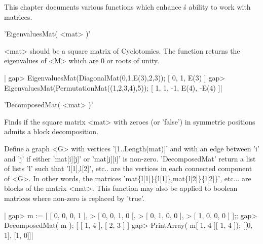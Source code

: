 

This  chapter documents various functions  which enhance \GAP\'s ability
to work with matrices.

%
%

'EigenvaluesMat( <mat> )'

<mat>  should be a  square matrix of  Cyclotomics. The function returns the
eigenvalues of <M> which are 0 or roots of unity.

|    gap> EigenvaluesMat(DiagonalMat(0,1,E(3),2,3));
    [ 0, 1, E(3) ]
    gap> EigenvaluesMat(PermutationMat((1,2,3,4),5));
    [ 1, 1, -1, E(4), -E(4) ]|

%
%

'DecomposedMat( <mat> )'

Finds  if the  square matrix  <mat> with  zeroes (or  'false') in symmetric
positions admits a block decomposition.

Define  a  graph  <G>  with  vertices  '[1..Length(mat)]'  and with an edge
between  'i'  and  'j'  if  either  'mat[i][j]' or 'mat[j][i]' is non-zero.
'DecomposedMat' return a list of lists 'l' such that 'l[1],l[2]', etc.. are
the  vertices  in  each  connected  component  of  <G>. In other words, the
matrices  'mat\{l[1]\}\{l[1]\},mat\{l[2]\}\{l[2]\}',  etc...  are blocks of
the  matrix <mat>.  This function  may also  be applied to boolean matrices
where non-zero is replaced by 'true'.

|    gap> m := [ [  0,  0,  0,  1 ],
    >           [  0,  0,  1,  0 ],
    >           [  0,  1,  0,  0 ],
    >           [  1,  0,  0,  0 ] ];;
    gap> DecomposedMat( m );
    [ [ 1, 4 ], [ 2, 3 ] ]
    gap> PrintArray( m{[ 1, 4 ]}{[ 1, 4 ]});
    [[0, 1],
     [1, 0]]|

%
%

